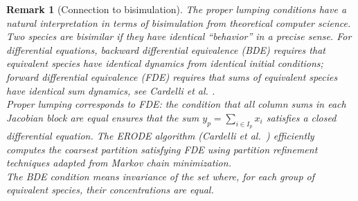\documentclass{article}
\newtheorem{remark}{Remark}
\begin{document}
\begin{remark}[Connection to bisimulation]\label{bisimrem}{\em
The proper lumping conditions have a natural interpretation in terms of \emph{bisimulation} from theoretical computer science. Two species are bisimilar if they have identical ``behavior'' in a precise sense. For differential equations, \emph{backward differential equivalence} (BDE) requires that equivalent species have identical dynamics from identical initial conditions; \emph{forward differential equivalence} (FDE) requires that sums of equivalent species have identical sum dynamics, see Cardelli et al. \cite{CardelliTTV2017}. \\
Proper lumping corresponds to FDE: the condition that all column sums in each Jacobian block are equal ensures that the sum $y_p = \sum_{i \in I_p} x_i$ satisfies a closed differential equation. The ERODE algorithm (Cardelli et al.\ \cite{CardelliTTV2019}) efficiently computes the coarsest partition satisfying FDE using partition refinement techniques adapted from Markov chain minimization.\\
The BDE condition means invariance of the set where, for each group of equivalent species, their concentrations are equal.}
\end{remark}
\end{document}
